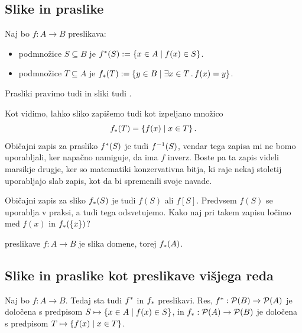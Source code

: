 \subsection{Slike in praslike}
\label{sec:slike-in-praslike-definicija}

\begin{definicija}
  \label{def:praslika-slika}
  Naj bo $f : A \to B$ preslikava:
  \begin{itemize}
  \item {} podmnožice $S \subseteq B$ je $f^{*}(S) \mathrel{{:}{=}} \left\{ x \in A \; \middle| \; f(x) \in S \right\}$.
  \item {} podmnožice $T \subseteq A$ je $f_{*}(T) \mathrel{{:}{=}} \left\{ y \in B \; \middle| \; \exists x \in T \,.\, f(x) = y \right\}$.
  \end{itemize}
\end{definicija}
%
Prasliki pravimo tudi  in sliki tudi .

Kot vidimo, lahko sliko zapišemo tudi kot izpeljano množico
%
\begin{equation*}
  f_{*}(T) = \left\{ f(x) \; \middle| \; x \in T \right\}.
\end{equation*}
%
Običajni zapis za prasliko $f^{*}(S)$ je tudi ${f}^{-1}(S)$, vendar tega zapisa mi ne bomo uporabljali, ker napačno namiguje, da ima $f$ inverz. Boste pa ta zapis videli marsikje drugje, ker so matematiki konzervativna bitja, ki raje nekaj stoletij uporabljajo slab zapis, kot da bi spremenili svoje navade.

Običajni zapis za sliko $f_{*}(S)$ je tudi $f(S)$ ali $f[S]$. Predvsem $f(S)$ se uporablja v praksi, a tudi tega odsvetujemo. Kako naj pri takem zapisu ločimo med $f(x)$ in $f_{*}(\left\{x\right\})$?

\begin{definicija}
  \label{def:zaloga-vrednosti}
   preslikave $f : A \to B$ je slika domene, torej $f_{*}(A)$.
\end{definicija}


\subsection{Slike in praslike kot preslikave višjega reda}
\label{sec:slike-visjega-reda}

Naj bo $f : A \to B$. Tedaj sta tudi $f^{*}$ in $f_{*}$ preslikavi.
%
Res, $f^{*} : \mathcal{P}(B) \to \mathcal{P}(A)$ je določena s predpisom $S \mapsto \left\{ x \in A \; \middle| \; f(x) \in S \right\}$, in
$f_{*} : \mathcal{P}(A) \to \mathcal{P}(B)$ je določena s predpisom $T \mapsto \left\{ f(x) \; \middle| \; x \in T \right\}$.

